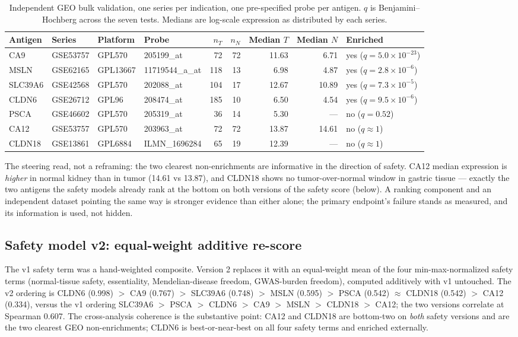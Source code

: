 \begin{table}[h]\centering\footnotesize
\caption{Independent GEO bulk validation, one series per indication, one
pre-specified probe per antigen. $q$ is Benjamini--Hochberg across the seven
tests. Medians are log-scale expression as distributed by each
series.}\label{tab:geo}
\begin{tabular}{llllrrrrl}
\toprule
Antigen & Series & Platform & Probe & $n_T$ & $n_N$ & Median $T$ & Median $N$ & Enriched \\
\midrule
CA9 & GSE53757 & GPL570 & 205199\_at & 72 & 72 & 11.63 & 6.71 & yes ($q=5.0{\times}10^{-23}$) \\
MSLN & GSE62165 & GPL13667 & 11719544\_a\_at & 118 & 13 & 6.98 & 4.87 & yes ($q=2.8{\times}10^{-6}$) \\
SLC39A6 & GSE42568 & GPL570 & 202088\_at & 104 & 17 & 12.67 & 10.89 & yes ($q=7.3{\times}10^{-5}$) \\
CLDN6 & GSE26712 & GPL96 & 208474\_at & 185 & 10 & 6.50 & 4.54 & yes ($q=9.5{\times}10^{-6}$) \\
PSCA & GSE46602 & GPL570 & 205319\_at & 36 & 14 & 5.30 & --- & no ($q=0.52$) \\
CA12 & GSE53757 & GPL570 & 203963\_at & 72 & 72 & 13.87 & 14.61 & no ($q\approx1$) \\
CLDN18 & GSE13861 & GPL6884 & ILMN\_1696284 & 65 & 19 & 12.39 & --- & no ($q\approx1$) \\
\bottomrule
\end{tabular}
\end{table}

The steering read, not a reframing: the two clearest non-enrichments are
informative in the direction of safety. CA12 median expression is \emph{higher}
in normal kidney than in tumor (14.61 vs 13.87), and CLDN18 shows no
tumor-over-normal window in gastric tissue --- exactly the two antigens the
safety models already rank at the bottom on both versions of the safety score
(below). A ranking component and an independent dataset pointing the same way is
stronger evidence than either alone; the primary endpoint's failure stands as
measured, and its information is used, not hidden.

\subsection{Safety model v2: equal-weight additive re-score}
The v1 safety term was a hand-weighted composite. Version 2 replaces it with an
equal-weight mean of the four min-max-normalized safety terms (normal-tissue
safety, essentiality, Mendelian-disease freedom, GWAS-burden freedom), computed
additively with v1 untouched. The v2 ordering is CLDN6 (0.998) $>$ CA9 (0.767)
$>$ SLC39A6 (0.748) $>$ MSLN (0.595) $>$ PSCA (0.542) $\approx$ CLDN18 (0.542)
$>$ CA12 (0.334), versus the v1 ordering SLC39A6 $>$ PSCA $>$ CLDN6 $>$ CA9 $>$
MSLN $>$ CLDN18 $>$ CA12; the two versions correlate at Spearman 0.607. The
cross-analysis coherence is the substantive point: CA12 and CLDN18 are bottom-two
on \emph{both} safety versions and are the two clearest GEO non-enrichments;
CLDN6 is best-or-near-best on all four safety terms and enriched externally.

